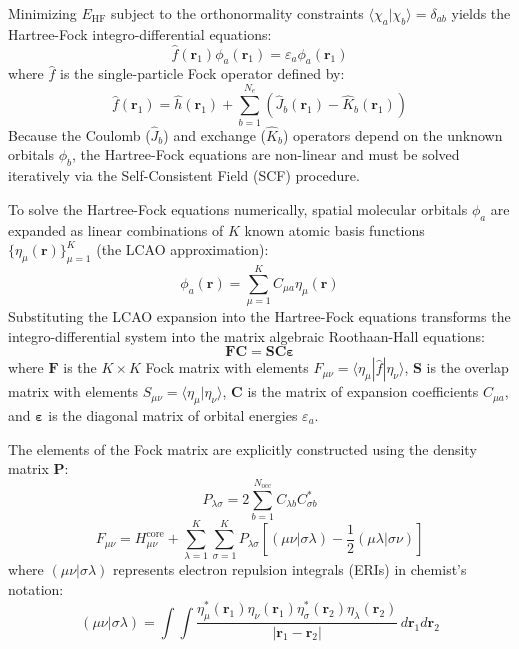 \documentclass[12pt]{article}
\begin{document}
Minimizing $E_{\text{HF}}$ subject to the orthonormality constraints $\langle \chi_a | \chi_b \rangle = \delta_{ab}$ yields the Hartree-Fock integro-differential equations:
\begin{equation}
\hat{f}(\mathbf{r}_1) \phi_a(\mathbf{r}_1) = \varepsilon_a \phi_a(\mathbf{r}_1)
\end{equation}
where $\hat{f}$ is the single-particle Fock operator defined by:
\begin{equation}
\hat{f}(\mathbf{r}_1) = \hat{h}(\mathbf{r}_1) + \sum_{b=1}^{N_e} \left( \hat{J}_b(\mathbf{r}_1) - \hat{K}_b(\mathbf{r}_1) \right)
\end{equation}
Because the Coulomb ($\hat{J}_b$) and exchange ($\hat{K}_b$) operators depend on the unknown orbitals $\phi_b$, the Hartree-Fock equations are non-linear and must be solved iteratively via the Self-Consistent Field (SCF) procedure.

To solve the Hartree-Fock equations numerically, spatial molecular orbitals $\phi_a$ are expanded as linear combinations of $K$ known atomic basis functions $\{\eta_\mu(\mathbf{r})\}_{\mu=1}^K$ (the LCAO approximation):
\begin{equation}
\phi_a(\mathbf{r}) = \sum_{\mu=1}^{K} C_{\mu a} \eta_\mu(\mathbf{r})
\end{equation}
Substituting the LCAO expansion into the Hartree-Fock equations transforms the integro-differential system into the matrix algebraic Roothaan-Hall equations:
\begin{equation}
\mathbf{F} \mathbf{C} = \mathbf{S} \mathbf{C} \boldsymbol{\varepsilon}
\end{equation}
where $\mathbf{F}$ is the $K \times K$ Fock matrix with elements $F_{\mu\nu} = \langle \eta_\mu | \hat{f} | \eta_\nu \rangle$, $\mathbf{S}$ is the overlap matrix with elements $S_{\mu\nu} = \langle \eta_\mu | \eta_\nu \rangle$, $\mathbf{C}$ is the matrix of expansion coefficients $C_{\mu a}$, and $\boldsymbol{\varepsilon}$ is the diagonal matrix of orbital energies $\varepsilon_a$.

The elements of the Fock matrix are explicitly constructed using the density matrix $\mathbf{P}$:
\begin{equation}
P_{\lambda\sigma} = 2 \sum_{b=1}^{N_{\text{occ}}} C_{\lambda b} C_{\sigma b}^*
\end{equation}
\begin{equation}
F_{\mu\nu} = H_{\mu\nu}^{\text{core}} + \sum_{\lambda=1}^{K} \sum_{\sigma=1}^{K} P_{\lambda\sigma} \left[ (\mu\nu|\sigma\lambda) - \frac{1}{2}(\mu\lambda|\sigma\nu) \right]
\end{equation}
where $(\mu\nu|\sigma\lambda)$ represents electron repulsion integrals (ERIs) in chemist's notation:
\begin{equation}
(\mu\nu|\sigma\lambda) = \int \int \frac{\eta_\mu^*(\mathbf{r}_1) \eta_\nu(\mathbf{r}_1) \eta_\sigma^*(\mathbf{r}_2) \eta_\lambda(\mathbf{r}_2)}{|\mathbf{r}_1 - \mathbf{r}_2|} \, d\mathbf{r}_1 d\mathbf{r}_2
\end{equation}
\end{document}
